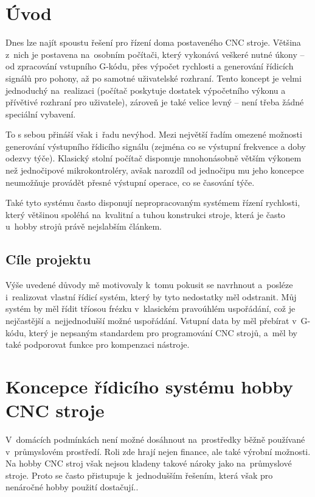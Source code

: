 \chapter{Úvod}

	Dnes lze najít spoustu řešení pro řízení doma postaveného CNC stroje. Většina z~nich je postavena na~osobním počítači, který vykonává veškeré nutné úkony – od zpracování vstupního G-kódu, přes výpočet rychlosti a generování řídicích signálů pro pohony, až po samotné uživatelské rozhraní. Tento koncept je velmi jednoduchý na~realizaci (počítač poskytuje dostatek výpočetního výkonu a přívětivé rozhraní pro uživatele), zároveň je také velice levný – není třeba žádné speciální vybavení.
	
	To s sebou přináší však i~řadu nevýhod. Mezi největší řadím omezené možnosti generování výstupního řídicího signálu (zejména co se výstupní frekvence a doby odezvy týče). Klasický stolní počítač disponuje mnohonásobně větším výkonem než jednočipové mikrokontroléry, avšak narozdíl od jednočipu mu jeho koncepce neumožňuje provádět přesné výstupní operace, co se časování týče.
	
	Také tyto systému často disponují nepropracovaným systémem řízení rychlosti, který většinou spoléhá na~kvalitní a tuhou konstrukci stroje, která je často u~hobby strojů právě nejslabším článkem.
	
	\section{Cíle projektu}	
	Výše uvedené důvody mě motivovaly k~tomu pokusit se navrhnout a~posléze i~realizovat vlastní řídicí systém, který by tyto nedostatky měl odstranit. Můj systém by měl řídit tříosou frézku v~klasickém pravoúhlém uspořádání, což je nejčastější a~nejjednodušší možné uspořádání. Vstupní data by měl přebírat v~G-kódu, který je nepsaným standardem pro programování CNC strojů, a~měl by také podporovat funkce pro kompenzaci nástroje.

\chapter{Koncepce řídicího systému hobby CNC stroje}

	V~domácích podmínkách není možné dosáhnout na~prostředky běžně používané v~průmyslovém prostředí. Roli zde hrají nejen finance, ale také výrobní možnosti. Na hobby CNC stroj však nejsou kladeny takové nároky jako na~průmyslové stroje. Proto se často přistupuje k~jednodušším řešením, která však pro nenáročné hobby použití dostačují..
	
